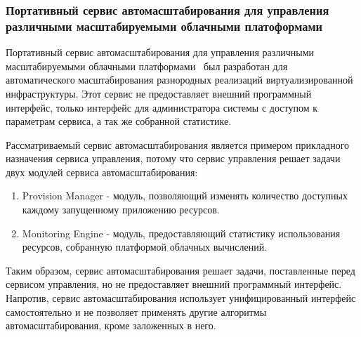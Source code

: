 \subsubsection*{Портативный сервис автомасштабирования для управления различными масштабируемыми облачными платоформами}
Портативный сервис автомасштабирования для управления различными масштабируемыми облачными платформами~\cite{portable-autoscaler-for-managing-multi-cloud-elasticity} был разработан для автоматического масштабирования разнородных реализаций виртуализированной инфраструктуры.
Этот сервис не предоставляет внешний программный интерфейс, только интерфейс для администратора системы с доступом к параметрам сервиса, а так же собранной статистике.

Рассматриваемый сервис автомасштабирования является примером прикладного назначения сервиса управления, потому что сервис управления решает задачи двух модулей сервиса автомасштабирования:
\begin{enumerate}
    \item Provision Manager - модуль, позволяющий изменять количество доступных каждому запущенному приложению ресурсов.
    \item Monitoring Engine - модуль, предоставляющий статистику использования ресурсов, собранную платформой облачных вычислений.
\end{enumerate}

Таким образом, сервис автомасштабирования решает задачи, поставленные перед сервисом управления, но не предоставляет внешний программный интерфейс.
Напротив, сервис автомасштабирования использует унифицированный интерфейс самостоятельно и не позволяет применять другие алгоритмы автомасштабирования, кроме заложенных в него.